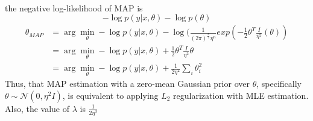 \begin{answer}\\
the negative log-likelihood of MAP is $$-\log p(y|x, \theta)-\log p(\theta)$$
\begin{align*}
    \theta_{MAP} &= \arg\min\limits_\theta -\log p(y|x, \theta) - \log (\frac{1}{(2\pi)^{\frac{n}{2}}\eta^n}exp(-\frac{1}{2}\theta^T\frac{I}{\eta^2}(\theta))\\
    &= \arg\min\limits_\theta -\log p(y|x, \theta) + \frac{1}{2}\theta^T\frac{I}{\eta^2}\theta\\
    &=\arg\min\limits_\theta -\log p(y|x, \theta) + \frac{1}{2\eta^2}\sum\limits_i \theta_i^2
\end{align*}
Thus, that MAP estimation with a zero-mean Gaussian prior over $\theta$, specifically $\theta \sim \mathcal{N}(0, \eta^2I)$, is equivalent to applying $L_2$ regularization with MLE estimation. Also, the value of $\lambda$ is $\frac{1}{2\eta^2}$
\end{answer}
